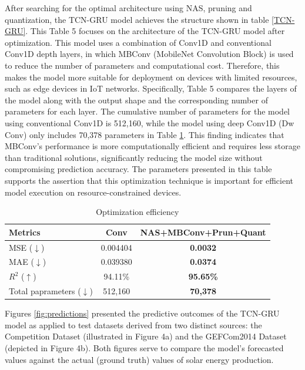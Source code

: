 \documentclass[sn-mathphys-num]{sn-jnl}%
\begin{document}
After searching for the optimal architecture using NAS, pruning and quantization, the TCN-GRU model achieves the structure shown in table \ref{TCN-GRU}. This Table 5 focuses on the architecture of the TCN-GRU model after optimization. This model uses a combination of Conv1D and conventional Conv1D depth layers, in which MBConv (MobileNet Convolution Block) is used to reduce the number of parameters and computational cost. Therefore, this makes the model more suitable for deployment on devices with limited resources, such as edge devices in IoT networks. Specifically, Table 5 compares the layers of the model along with the output shape and the corresponding number of parameters for each layer. The cumulative number of parameters for the model using conventional Conv1D is 512,160, while the model using deep Conv1D (Dw Conv) only includes 70,378 parameters in Table \ref{t6}. This finding indicates that MBConv's performance is more computationally efficient and requires less storage than traditional solutions, significantly reducing the model size without compromising prediction accuracy. The parameters presented in this table supports the assertion that this optimization technique is important for efficient model execution on resource-constrained devices.

\begin{table}[hb!]
    \centering
    \caption{Optimization efficiency}
    \begin{tabular}{l|c|c}
        \toprule
        \textbf{Metrics} & \textbf{Conv} & \textbf{NAS+MBConv+Prun+Quant} \\
        \midrule
        MSE ($\downarrow$) & 0.004404 & \textbf{0.0032} \\
        MAE ($\downarrow$) & 0.039380 & \textbf{0.0374} \\
        $R^2$ ($\uparrow$) & 94.11\% & \textbf{95.65\%} \\
        Total paprameters ($\downarrow$) & 512,160 & \textbf{70,378} \\
        \bottomrule
    \end{tabular}
    \label{t6}
\end{table}

Figures \ref{fig:predictions} presented the predictive outcomes of the TCN-GRU model as applied to test datasets derived from two distinct sources: the Competition Dataset (illustrated in Figure 4a) and the GEFCom2014 Dataset (depicted in Figure 4b). Both figures serve to compare the model's forecasted values against the actual (ground truth) values of solar energy production.
\end{document}
